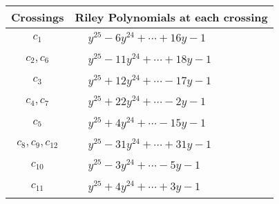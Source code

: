 \documentclass[1p]{elsarticle_modified}
\theoremstyle{definition}
\begin{document}
\begin{tabular}{m{50pt}|m{274pt}}
Crossings & \hspace{64pt}Riley Polynomials at each crossing \\
\hline $$\begin{aligned}c_{1}\end{aligned}$$&$\begin{aligned}
&y^{25}-6 y^{24}+\cdots+16 y-1
\end{aligned}$\\
\hline $$\begin{aligned}c_{2},c_{6}\end{aligned}$$&$\begin{aligned}
&y^{25}-11 y^{24}+\cdots+18 y-1
\end{aligned}$\\
\hline $$\begin{aligned}c_{3}\end{aligned}$$&$\begin{aligned}
&y^{25}+12 y^{24}+\cdots-17 y-1
\end{aligned}$\\
\hline $$\begin{aligned}c_{4},c_{7}\end{aligned}$$&$\begin{aligned}
&y^{25}+22 y^{24}+\cdots-2 y-1
\end{aligned}$\\
\hline $$\begin{aligned}c_{5}\end{aligned}$$&$\begin{aligned}
&y^{25}+4 y^{24}+\cdots-15 y-1
\end{aligned}$\\
\hline $$\begin{aligned}c_{8},c_{9},c_{12}\end{aligned}$$&$\begin{aligned}
&y^{25}-31 y^{24}+\cdots+31 y-1
\end{aligned}$\\
\hline $$\begin{aligned}c_{10}\end{aligned}$$&$\begin{aligned}
&y^{25}-3 y^{24}+\cdots-5 y-1
\end{aligned}$\\
\hline $$\begin{aligned}c_{11}\end{aligned}$$&$\begin{aligned}
&y^{25}+4 y^{24}+\cdots+3 y-1
\end{aligned}$\\
\hline
\end{tabular}\\~\\
\end{document}
